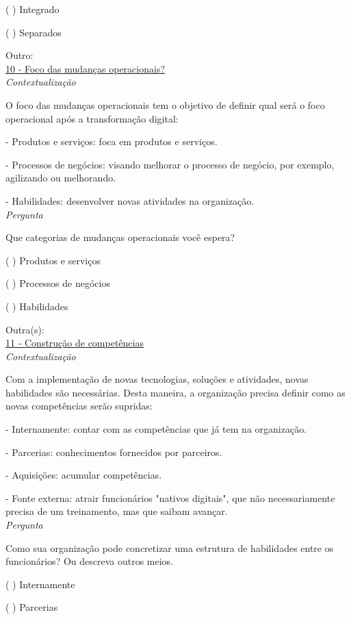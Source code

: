 ( ) Integrado

( ) Separados

Outro:\\


\underline{10 - Foco das mudanças operacionais?}\\

\textit{Contextualização}

O foco das mudanças operacionais tem o objetivo de definir qual será o foco operacional após a transformação digital:


- Produtos e serviços: foca em produtos e serviços.

- Processos de negócios: visando melhorar o processo de negócio, por exemplo, agilizando ou melhorando.

- Habilidades: desenvolver novas atividades na organização.\\


\textit{Pergunta}

Que categorias de mudanças operacionais você espera?

( ) Produtos e serviços

( ) Processos de negócios

( ) Habilidades

Outra(s):\\

\underline{11 - Construção de competências}\\

\textit{Contextualização}

Com a implementação de novas tecnologias, soluções e atividades, novas habilidades são necessárias. Desta maneira, a organização precisa definir como as novas competências serão supridas:

- Internamente: contar com as competências que já tem na organização.

- Parcerias: conhecimentos fornecidos por parceiros.

- Aquisições: acumular competências.

- Fonte externa: atrair funcionários "nativos digitais", que não necessariamente precisa de um treinamento, mas que saibam avançar.\\


\textit{Pergunta}

Como sua organização pode concretizar uma estrutura de habilidades entre os funcionários? Ou descreva outros meios.

( ) Internamente

( ) Parcerias

